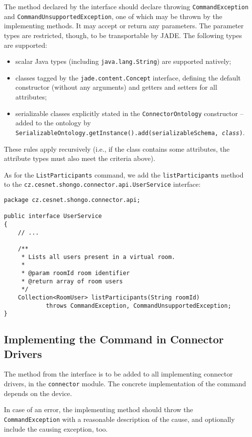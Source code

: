 The method declared by the interface should declare throwing \texttt{CommandException} and \texttt{CommandUnsupportedException}, one of which may be thrown by the implementing methods. It may accept or return any parameters. The parameter types are restricted, though, to be transportable by JADE. The following types are supported:
\begin{itemize}
\item scalar Java types (including \texttt{java.lang.String}) are supported natively;
\item classes tagged by the \texttt{jade.content.Concept} interface, defining the default constructor (without any arguments) and getters and setters for all attributes;
\item serializable classes explicitly stated in the \texttt{ConnectorOntology} constructor -- added to the ontology by \texttt{SerializableOntology.getInstance().add(serializableSchema, \textit{class})}.
\end{itemize}
These rules apply recursively (i.e., if the class contains some attributes, the attribute types must also meet the criteria above).

\bigskip

As for the \texttt{ListParticipants} command, we add the \texttt{listParticipants} method to the \texttt{cz.cesnet.shongo.connector.api.UserService} interface:

{ \small
\begin{verbatim}
package cz.cesnet.shongo.connector.api;

public interface UserService
{
    // ...

    /**
     * Lists all users present in a virtual room.
     *
     * @param roomId room identifier
     * @return array of room users
     */
    Collection<RoomUser> listParticipants(String roomId)
            throws CommandException, CommandUnsupportedException;
}
\end{verbatim}
}


\subsection{Implementing the Command in Connector Drivers}

The method from the interface is to be added to all implementing connector drivers, in the \texttt{connector} module. The concrete implementation of the command depends on the device.

In case of an error, the implementing method should throw the \texttt{CommandException} with a reasonable description of the cause, and optionally include the causing exception, too.

